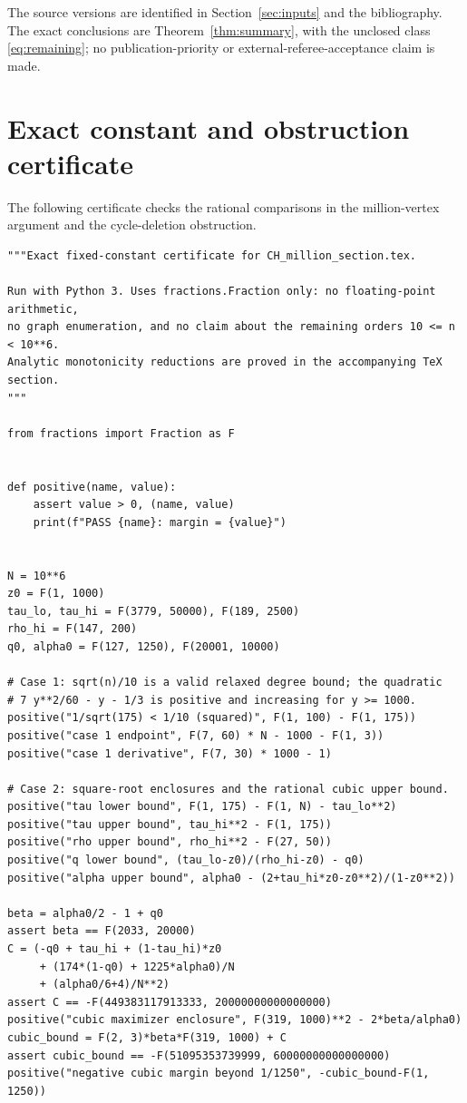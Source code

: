 \documentclass[11pt,a4paper]{article}
\theoremstyle{remark}\newtheorem{remark}[theorem]{Remark}
\begin{document}
The source versions are identified in Section~\ref{sec:inputs} and the
bibliography. The exact conclusions are Theorem~\ref{thm:summary}, with
the unclosed class \eqref{eq:remaining}; no publication-priority or
external-referee-acceptance claim is made.

\clearpage
\appendix
\section{Exact constant and obstruction certificate}
\label{app:constants}
The following certificate checks the rational comparisons in the
million-vertex argument and the cycle-deletion obstruction.

\begin{lstlisting}
"""Exact fixed-constant certificate for CH_million_section.tex.

Run with Python 3. Uses fractions.Fraction only: no floating-point arithmetic,
no graph enumeration, and no claim about the remaining orders 10 <= n < 10**6.
Analytic monotonicity reductions are proved in the accompanying TeX section.
"""

from fractions import Fraction as F


def positive(name, value):
    assert value > 0, (name, value)
    print(f"PASS {name}: margin = {value}")


N = 10**6
z0 = F(1, 1000)
tau_lo, tau_hi = F(3779, 50000), F(189, 2500)
rho_hi = F(147, 200)
q0, alpha0 = F(127, 1250), F(20001, 10000)

# Case 1: sqrt(n)/10 is a valid relaxed degree bound; the quadratic
# 7 y**2/60 - y - 1/3 is positive and increasing for y >= 1000.
positive("1/sqrt(175) < 1/10 (squared)", F(1, 100) - F(1, 175))
positive("case 1 endpoint", F(7, 60) * N - 1000 - F(1, 3))
positive("case 1 derivative", F(7, 30) * 1000 - 1)

# Case 2: square-root enclosures and the rational cubic upper bound.
positive("tau lower bound", F(1, 175) - F(1, N) - tau_lo**2)
positive("tau upper bound", tau_hi**2 - F(1, 175))
positive("rho upper bound", rho_hi**2 - F(27, 50))
positive("q lower bound", (tau_lo-z0)/(rho_hi-z0) - q0)
positive("alpha upper bound", alpha0 - (2+tau_hi*z0-z0**2)/(1-z0**2))

beta = alpha0/2 - 1 + q0
assert beta == F(2033, 20000)
C = (-q0 + tau_hi + (1-tau_hi)*z0
     + (174*(1-q0) + 1225*alpha0)/N
     + (alpha0/6+4)/N**2)
assert C == -F(449383117913333, 20000000000000000)
positive("cubic maximizer enclosure", F(319, 1000)**2 - 2*beta/alpha0)
cubic_bound = F(2, 3)*beta*F(319, 1000) + C
assert cubic_bound == -F(51095353739999, 60000000000000000)
positive("negative cubic margin beyond 1/1250", -cubic_bound-F(1, 1250))


\end{lstlisting}
\end{document}
